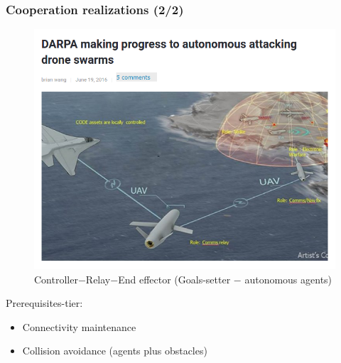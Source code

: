 \begin{frame} %
  \frametitle{Cooperation realizations (2/2)}

\begin{minipage}{0.45\textwidth}
\begin{figure}[H]
\includegraphics[scale=0.25]{figures/darpa_relay.png}
  \caption{Controller$-$Relay$-$End effector (Goals-setter $-$ autonomous agents)}
  \label{im:darpa_relay_2}
\end{figure}
\end{minipage} \hfill
\begin{minipage}{0.4\textwidth}
Prerequisites-tier:
\begin{itemize}
\item Connectivity maintenance
\item Collision avoidance (agents plus obstacles)
\end{itemize}
\end{minipage}

\end{frame} %
